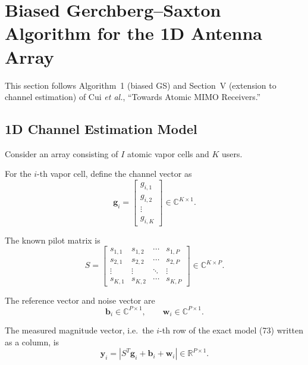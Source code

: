 \documentclass[12pt,a4paper]{article}
\begin{document}
\section{Biased Gerchberg--Saxton Algorithm for the 1D Antenna Array}

This section follows Algorithm~1 (biased GS) and Section~V
(extension to channel estimation) of Cui \emph{et al.},
``Towards Atomic MIMO Receivers.''

\subsection{1D Channel Estimation Model}

Consider an array consisting of $I$ atomic vapor cells and $K$ users.

For the $i$-th vapor cell, define the channel vector as
\begin{equation}
\boxed{
\mathbf g_i
=
\begin{bmatrix}
g_{i,1}\\
g_{i,2}\\
\vdots\\
g_{i,K}
\end{bmatrix}
\in
\mathbb{C}^{K\times1}
}.
\tag{224}
\end{equation}

The known pilot matrix is
\begin{equation}
\boxed{
S=
\begin{bmatrix}
s_{1,1}&s_{1,2}&\cdots&s_{1,P}\\
s_{2,1}&s_{2,2}&\cdots&s_{2,P}\\
\vdots&\vdots&\ddots&\vdots\\
s_{K,1}&s_{K,2}&\cdots&s_{K,P}
\end{bmatrix}
\in
\mathbb{C}^{K\times P}
}.
\tag{225}
\end{equation}

The reference vector and noise vector are
\begin{equation}
\mathbf b_i\in\mathbb{C}^{P\times1},
\qquad
\mathbf w_i\in\mathbb{C}^{P\times1}.
\tag{226}
\end{equation}

The measured magnitude vector, i.e.\ the $i$-th row of the exact
model (73) written as a column, is
\begin{equation}
\boxed{
\mathbf y_i
=
\left|
S^T\mathbf g_i+\mathbf b_i+\mathbf w_i
\right|
\in
\mathbb{R}^{P\times1}
}.
\tag{227}
\end{equation}
\end{document}
